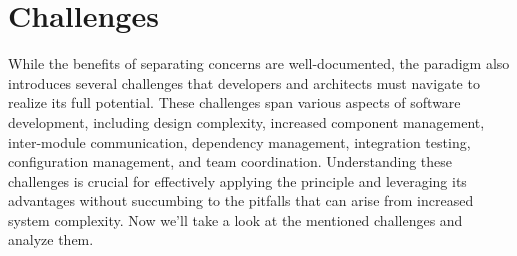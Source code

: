 \section{Challenges}
While the benefits of separating concerns are well-documented, the paradigm also introduces several challenges that developers and architects must navigate to realize its full potential.
These challenges span various aspects of software development, including design complexity, increased component management, inter-module communication, dependency management, integration testing, configuration management, and team coordination.
Understanding these challenges is crucial for effectively applying the principle and leveraging its advantages without succumbing to the pitfalls that can arise from increased system complexity.
Now we'll take a look at the mentioned challenges and analyze them.

